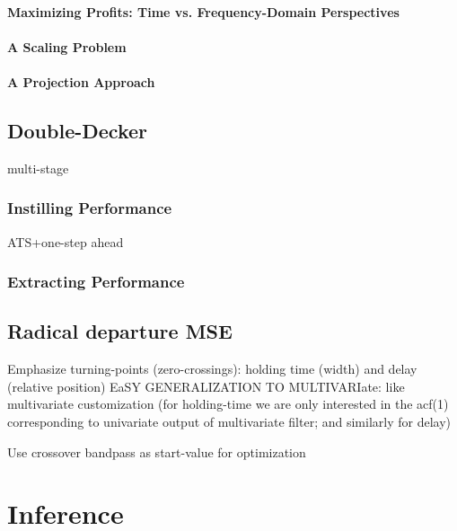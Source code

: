 \documentclass[a4paper]{book}
\begin{document}
\subsubsection{Maximizing Profits: Time vs. Frequency-Domain Perspectives}


\subsubsection{A Scaling Problem}


\subsubsection{A Projection Approach}



\section{Double-Decker}
multi-stage

\subsection{Instilling Performance}

ATS+one-step ahead 


\subsection{Extracting Performance}



\section{Radical departure MSE}

Emphasize turning-points (zero-crossings): holding time (width) and delay (relative position)
EaSY GENERALIZATION TO MULTIVARIate: like multivariate customization (for holding-time we are only interested in the acf(1) corresponding to univariate output of multivariate filter; and similarly for delay)

Use crossover bandpass as start-value for optimization








\chapter{Inference}\label{inf_sec}
\end{document}
